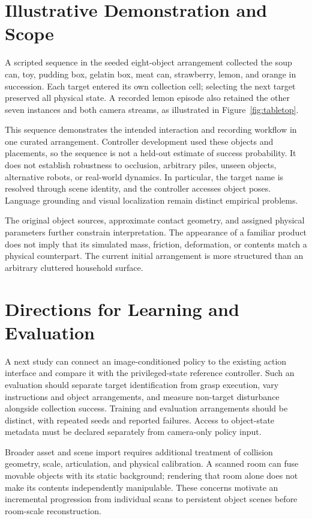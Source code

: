 \documentclass[10pt]{article}
\begin{document}
\section{Illustrative Demonstration and Scope}
A scripted sequence in the seeded eight-object arrangement collected the soup can, toy, pudding box, gelatin box, meat can, strawberry, lemon, and orange in succession. Each target entered its own collection cell; selecting the next target preserved all physical state. A recorded lemon episode also retained the other seven instances and both camera streams, as illustrated in Figure~\ref{fig:tabletop}.

This sequence demonstrates the intended interaction and recording workflow in one curated arrangement. Controller development used these objects and placements, so the sequence is not a held-out estimate of success probability. It does not establish robustness to occlusion, arbitrary piles, unseen objects, alternative robots, or real-world dynamics. In particular, the target name is resolved through scene identity, and the controller accesses object poses. Language grounding and visual localization remain distinct empirical problems.

The original object sources, approximate contact geometry, and assigned physical parameters further constrain interpretation. The appearance of a familiar product does not imply that its simulated mass, friction, deformation, or contents match a physical counterpart. The current initial arrangement is more structured than an arbitrary cluttered household surface.

\section{Directions for Learning and Evaluation}
A next study can connect an image-conditioned policy to the existing action interface and compare it with the privileged-state reference controller. Such an evaluation should separate target identification from grasp execution, vary instructions and object arrangements, and measure non-target disturbance alongside collection success. Training and evaluation arrangements should be distinct, with repeated seeds and reported failures. Access to object-state metadata must be declared separately from camera-only policy input.

Broader asset and scene import requires additional treatment of collision geometry, scale, articulation, and physical calibration. A scanned room can fuse movable objects with its static background; rendering that room alone does not make its contents independently manipulable. These concerns motivate an incremental progression from individual scans to persistent object scenes before room-scale reconstruction.
\end{document}
